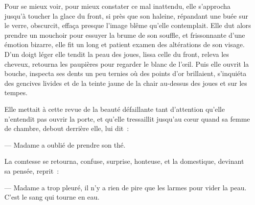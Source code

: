 {Pour se mieux voir, pour mieux constater ce mal inattendu, elle s'approcha jusqu'à toucher la glace du front, si près que son haleine, répandant une buée sur le verre, obscurcit, effaça presque l'image blême qu'elle contemplait. Elle dut alors prendre un mouchoir pour essuyer la brume de son souffle, et frissonnante d'une émotion bizarre, elle fit un long et patient examen des altérations de son visage. D'un doigt léger elle tendit la peau des joues, lissa celle du front, releva les cheveux, retourna les paupières pour regarder le blanc de l'œil. Puis elle ouvrit la bouche, inspecta ses dents un peu ternies où des points d'or brillaient, s'inquiéta des gencives livides et de la teinte jaune de la chair au-dessus des joues et sur les tempes.

Elle mettait à cette revue de la beauté défaillante tant d'attention qu'elle n'entendit pas ouvrir la porte, et qu'elle tressaillit jusqu'au cœur quand sa femme de chambre, debout derrière elle, lui dit~:

— Madame a oublié de prendre son thé.

La comtesse se retourna, confuse, surprise, honteuse, et la domestique, devinant sa pensée, reprit~:

— Madame a trop pleuré, il n'y a rien de pire que les larmes pour vider la peau. C'est le sang qui tourne en eau.
}

